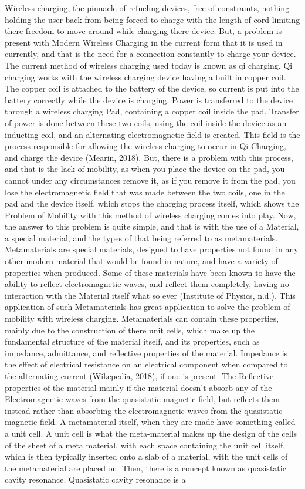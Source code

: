 \documentclass[]{article}
\begin{document}
Wireless charging, the pinnacle of refueling devices, free of constraints, nothing holding the user back from being forced to charge with the length of cord limiting there freedom to move around while charging there device. But, a problem is present with Modern Wireless Charging in the current form that it is used in currently, and that is the need for a connection constantly to charge your device. The current method of wireless charging used today is known as qi charging. Qi charging works with the wireless charging device having a built in copper coil. The copper coil is attached to the battery of the device, so current is put into the battery correctly while the device is charging. Power is transferred to the device through a wireless charging Pad, containing a copper coil inside the pad. Transfer of power is done between these two coils, using the coil inside the device as an inducting coil, and an alternating electromagnetic field is created. This field is the process responsible for allowing the wireless charging to occur in Qi Charging, and charge the device (Mearin, 2018). But, there is a problem with this process, and that is the lack of mobility, as when you place the device on the pad, you cannot under any circumstances remove it, as if you remove it from the pad, you lose the electromagnetic field that was made between the two coils, one in the pad and the device itself, which stops the charging process itself, which shows the Problem of Mobility with this method of wireless charging comes into play. Now, the answer to this problem is quite simple, and that is with the use of a Material, a special material, and the types of that being referred to as metamaterials. Metamaterials are special materials, designed to have properties not found in any other modern material that would be found in nature, and have a variety of properties when produced. Some of these materials have been known to have the ability to reflect electromagnetic waves, and reflect them completely, having no interaction with the Material itself what so ever (Institute of Physics, n.d.). This application of such Metamaterials has great application to solve the problem of mobility with wireless charging. Metamaterials can contain these properties, mainly due to the construction of there unit cells, which make up the fundamental structure of the material itself, and its properties, such as impedance, admittance, and reflective properties of the material. Impedance is the effect of electrical resistance on an electrical component when compared to the alternating current (Wikepedia, 2018), if one is present. The Reflective properties of the material mainly if the material doesn't absorb any of the Electromagnetic waves from the quasistatic magnetic field, but reflects them instead rather than absorbing the electromagnetic waves from the quasistatic magnetic field. A metamaterial itself, when they are made have something called a unit cell. A unit cell is what the meta-material makes up the design of the cells of the sheet of a meta material, with each space containing the unit cell itself, which is then typically inserted onto a slab of a material, with the unit cells of the metamaterial are placed on. Then, there is a concept known as quasistatic cavity resonance. Quasistatic cavity resonance is a 
\end{document}
